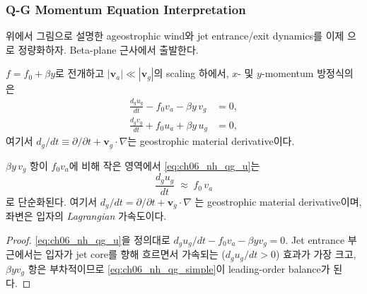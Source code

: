 \subsubsection{Q-G Momentum Equation Interpretation}

위에서 그림으로 설명한 ageostrophic wind와 jet entrance/exit dynamics를
이제 으로 정량화하자.
Beta-plane 근사에서 출발한다.

\begin{definition}
$f = f_0 + \beta y$로 전개하고 $|\mathbf{v}_a| \ll |\mathbf{v}_g|$의 scaling
하에서, $x$- 및 $y$-momentum 방정식의 은
\begin{align}
  \frac{d_g u_g}{dt} - f_0 v_a - \beta y\,v_g &= 0, \label{eq:ch06_nh_qg_u}\\
  \frac{d_g v_g}{dt} + f_0 u_a + \beta y\,u_g &= 0, \label{eq:ch06_nh_qg_v}
\end{align}
여기서 $d_g/dt \equiv \partial/\partial t + \mathbf{v}_g\cdot\nabla$는
geostrophic material derivative이다.
\end{definition}


\begin{proposition}
$\beta y\,v_g$ 항이 $f_0 v_a$에 비해 작은 영역에서 \eqref{eq:ch06_nh_qg_u}는
\begin{equation}\label{eq:ch06_nh_qg_simple}
  \frac{d_g u_g}{dt} \;\approx\; f_0\, v_a
\end{equation}
로 단순화된다.  여기서 $d_g/dt = \partial/\partial t + \mathbf{v}_g\cdot\nabla$
는 geostrophic material derivative이며, 좌변은 입자의 \emph{Lagrangian}
가속도이다.
\end{proposition}

\begin{proof}
\eqref{eq:ch06_nh_qg_u}을 정의대로
$d_g u_g/dt - f_0 v_a - \beta y v_g = 0$.
Jet entrance 부근에서는 입자가 jet core를 향해 흐르면서 가속되는
($d_g u_g/dt > 0$) 효과가 가장 크고, $\beta y v_g$ 항은 부차적이므로
\eqref{eq:ch06_nh_qg_simple}이 leading-order balance가 된다.
\end{proof}

